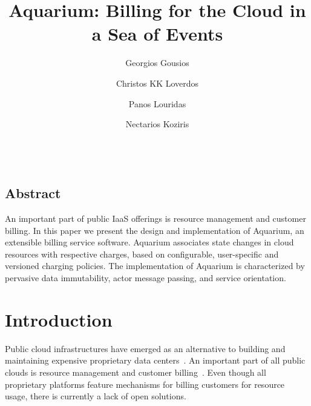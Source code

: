 \documentclass[letterpaper,twocolumn,10pt]{article}
\begin{document}
\date{}

\title{Aquarium: Billing for the Cloud in a Sea of Events}

\author{
{\rm Georgios Gousios}\\
\and
{\rm Christos KK Loverdos}\\
\and
{\rm Panos Louridas}\\
\and
{\rm Nectarios Koziris}\\
\and
{}\\
} %

\maketitle


\thispagestyle{empty}

\subsection*{Abstract}

An important part of public IaaS offerings is resource management and
customer billing. In this paper we present the design and
implementation of Aquarium, an extensible billing service software.
Aquarium associates state changes in cloud resources with respective
charges, based on configurable, user-specific and versioned charging
policies. The implementation of Aquarium is characterized by pervasive
data immutability, actor message passing, and service orientation.

\section{Introduction}

Public cloud infrastructures have emerged as an alternative to
building and maintaining expensive proprietary data
centers~\cite{Lourid10}. An important part of all public clouds is
resource management and customer billing~\cite{Armbr10}. Even though
all proprietary platforms feature mechanisms for billing customers for
resource usage, there is currently a lack of open solutions.
\end{document}
